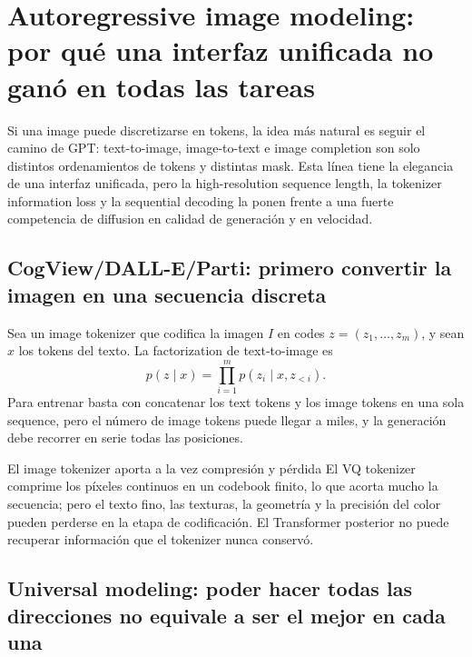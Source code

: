 \section{Autoregressive image modeling: por qué una interfaz unificada no ganó en todas las tareas}

Si una image puede discretizarse en tokens, la idea más natural es seguir el camino de GPT: text-to-image, image-to-text e image completion son solo distintos ordenamientos de tokens y distintas mask. Esta línea tiene la elegancia de una interfaz unificada, pero la high-resolution sequence length, la tokenizer information loss y la sequential decoding la ponen frente a una fuerte competencia de diffusion en calidad de generación y en velocidad.

\subsection{CogView/DALL-E/Parti: primero convertir la imagen en una secuencia discreta}

Sea un image tokenizer que codifica la imagen $I$ en codes $z=(z_1,\ldots,z_m)$, y sean $x$ los tokens del texto. La factorization de text-to-image es
\[
p(z\mid x)=\prod_{i=1}^{m}p(z_i\mid x,z_{<i}).
\]
Para entrenar basta con concatenar los text tokens y los image tokens en una sola sequence, pero el número de image tokens puede llegar a miles, y la generación debe recorrer en serie todas las posiciones.


\begin{importantbox}{El image tokenizer aporta a la vez compresión y pérdida}
El VQ tokenizer comprime los píxeles continuos en un codebook finito, lo que acorta mucho la secuencia; pero el texto fino, las texturas, la geometría y la precisión del color pueden perderse en la etapa de codificación. El Transformer posterior no puede recuperar información que el tokenizer nunca conservó.
\end{importantbox}


\subsection{Universal modeling: poder hacer todas las direcciones no equivale a ser el mejor en cada una}

